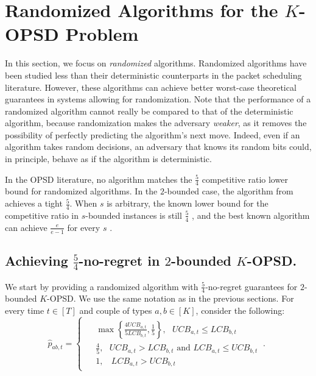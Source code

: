 \section{Randomized Algorithms for the $K$-OPSD Problem}
\label{sec:randomization}
In this section, we focus on \textit{randomized} algorithms. Randomized algorithms have been studied less than their deterministic counterparts in the packet scheduling literature. However, these algorithms can achieve better worst-case theoretical guarantees in systems allowing for randomization. Note that the performance of a randomized algorithm cannot really be compared to that of the deterministic algorithm, because randomization makes the adversary \textit{weaker}, as it removes the possibility of perfectly predicting the algorithm's next move. Indeed, even if an algorithm takes random decisions, an adversary that knows its random bits could, in principle, behave as if the algorithm is deterministic.

In the OPSD literature, no algorithm matches the $\frac{5}{4}$ competitive ratio lower bound for randomized algorithms. In the $2$-bounded case, the algorithm from \citep{chin2006online} achieves a tight $\frac{5}{4}$. When $s$ is arbitrary, the known lower bound for the competitive ratio in $s$-bounded instances is still $\frac{5}{4}$ \citep{chin2003online}, and the best known algorithm can achieve $\frac{e}{e-1}$ for every $s$ \citep{chin2006online}.

\subsection{Achieving $\frac{5}{4}$-no-regret in $2$-bounded $K$-OPSD.} 
We start by providing a randomized algorithm with $\frac{5}{4}$-no-regret guarantees for $2$-bounded $K$-OPSD. We use the same notation as in the previous sections. For every time $t \in [T]$ and couple of types $a,b \in [K]$, consider the following:
\begin{equation*}
    \widehat{p}_{ab, t} = \begin{cases}
    \begin{aligned}
        &\max \left\{\frac{4UCB_{a,t}}{5LCB_{b,t}}, \frac{1}{5}\right\}, ~~~UCB_{a,t}\le LCB_{b,t} \\
        &\frac{4}{5}, ~~~UCB_{a,t}> LCB_{b,t} \text{ and } LCB_{a,t}\le UCB_{b,t} \\
        &1, ~~~~ LCB_{a,t} > UCB_{b,t}
    \end{aligned}
    ~.
    \end{cases}
\end{equation*}

